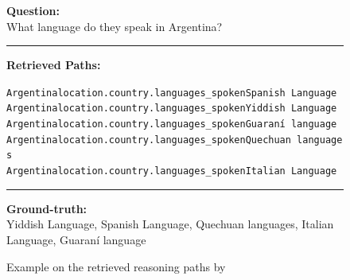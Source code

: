 \begin{figure}[t]
\begin{tcolorbox}[colback=gray!5!white,
                  colframe=gray!75!black,
                  title=WEBQSP-WebQTest-1993]
\scriptsize

\textbf{Question:}\\
What language do they speak in Argentina?

\rule{\linewidth}{0.4pt}

\textbf{Retrieved Paths:}\\[2pt]
{\raggedright
\texttt{Argentina\patharrow location.country.languages\_spoken\patharrow Spanish Language}\\[6pt]

\texttt{Argentina\patharrow location.country.languages\_spoken\patharrow Yiddish Language}\\[6pt]

\texttt{Argentina\patharrow location.country.languages\_spoken\patharrow Guaraní language}\\[6pt]

\texttt{Argentina\patharrow location.country.languages\_spoken\patharrow Quechuan languages}\\[6pt]

\texttt{Argentina\patharrow location.country.languages\_spoken\patharrow Italian Language}\\[6pt]

\par}

\rule{\linewidth}{0.4pt}

\textbf{Ground-truth:}\\
Yiddish Language, Spanish Language, Quechuan languages, Italian Language, Guaraní language

\end{tcolorbox}
\caption{Example on the retrieved reasoning paths by \proj}
\label{fig:example5}
\end{figure}


